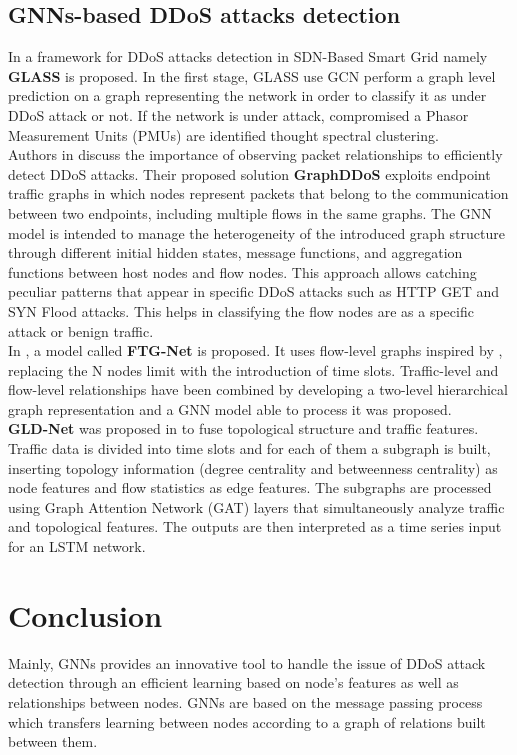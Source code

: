 \subsection{GNNs-based DDoS attacks detection}

In \cite{glass} a framework for DDoS attacks detection in SDN-Based Smart Grid namely \textbf{GLASS} is proposed. In the first stage, GLASS use GCN perform a graph level prediction on a graph representing the network in order to classify it as under DDoS attack or not. If the network is under attack, compromised a Phasor Measurement
Units (PMUs) are identified thought spectral clustering.\\
Authors in \cite{ graphddos} discuss the importance of observing packet relationships to efficiently detect DDoS attacks. Their proposed solution \textbf{GraphDDoS} exploits endpoint traffic graphs in which nodes represent packets that belong to the communication between two endpoints, including multiple flows in the same graphs.  The GNN model is intended to manage the heterogeneity of the introduced graph structure through different initial hidden states, message functions, and aggregation functions between host nodes and flow nodes. This approach allows catching peculiar patterns that appear in specific DDoS attacks such as HTTP GET and SYN Flood attacks. This helps in classifying the flow nodes are as a specific attack or benign traffic.\\
In \cite{Ftgnet}, a model called \textbf{ FTG-Net} is proposed. It uses flow-level graphs inspired by \cite{ graphddos}, replacing the N nodes limit with the introduction of time slots. Traffic-level and flow-level relationships have been combined by developing a two-level hierarchical graph representation and a GNN model able to process it was proposed.\\
\textbf{GLD-Net} was proposed in \cite{gldnet} to fuse topological structure and traffic features. Traffic data is divided into time slots and for each of them a subgraph is built, inserting topology information (degree centrality and betweenness centrality) as node features and flow statistics as edge features. The subgraphs are processed using Graph Attention Network (GAT) layers that simultaneously analyze traffic and topological features. The outputs are then interpreted as a time series input for an LSTM network.

\section{Conclusion}
Mainly, GNNs provides an innovative tool to handle the issue of DDoS attack detection through an efficient learning based on node's features as well as relationships between nodes. GNNs are based on the message passing process which transfers learning between nodes according to a graph of relations built between them. 